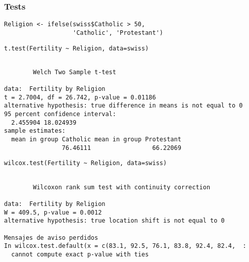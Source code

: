 \documentclass{beamer}
\begin{document}
\begin{frame}[fragile]
\frametitle{Tests}
\label{sec-2-8}


\lstset{language=R}
\begin{lstlisting}
Religion <- ifelse(swiss$Catholic > 50,
                   'Catholic', 'Protestant')
\end{lstlisting}



\lstset{language=R}
\begin{lstlisting}
t.test(Fertility ~ Religion, data=swiss)
\end{lstlisting}


\begin{verbatim}

        Welch Two Sample t-test

data:  Fertility by Religion 
t = 2.7004, df = 26.742, p-value = 0.01186
alternative hypothesis: true difference in means is not equal to 0 
95 percent confidence interval:
  2.455904 18.024939 
sample estimates:
  mean in group Catholic mean in group Protestant 
                76.46111                 66.22069
\end{verbatim}


\lstset{language=R}
\begin{lstlisting}
wilcox.test(Fertility ~ Religion, data=swiss)
\end{lstlisting}


\begin{verbatim}

        Wilcoxon rank sum test with continuity correction

data:  Fertility by Religion 
W = 409.5, p-value = 0.0012
alternative hypothesis: true location shift is not equal to 0 

Mensajes de aviso perdidos
In wilcox.test.default(x = c(83.1, 92.5, 76.1, 83.8, 92.4, 82.4,  :
  cannot compute exact p-value with ties
\end{verbatim}
\end{frame}
\end{document}
